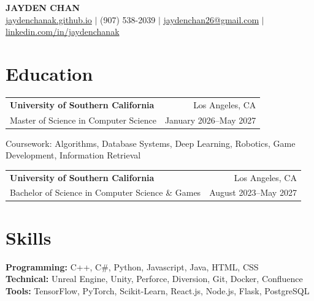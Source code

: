 \documentclass[letterpaper,10pt]{article}
\makeatletter
\newcommand{\entry}[4]{%
  \noindent\begin{tabularx}{\textwidth}{@{}X r@{}}
    \textbf{#1} & #2 \\
    #3 & #4 \\
  \end{tabularx}%
  \vspace{-2pt}
}
\makeatother
\begin{document}
\begin{center}
  {\LARGE\bfseries JAYDEN CHAN}\\[4pt]
  \href{https://jaydenchanak.github.io}{jaydenchanak.github.io} $|$
  (907) 538-2039 $|$
  \href{mailto:jaydenchan26@gmail.com}{jaydenchan26@gmail.com} $|$
  \href{https://www.linkedin.com/in/jaydenchanak}{linkedin.com/in/jaydenchanak}
\end{center}

\section{Education}
\entry{University of Southern California}{Los Angeles, CA}
      {Master of Science in Computer Science}{January 2026--May 2027}
\begin{tight}
  \item Coursework: Algorithms, Database Systems, Deep Learning, Robotics, Game Development, Information Retrieval
\end{tight}
\vspace{2pt}
\entry{University of Southern California}{Los Angeles, CA}
      {Bachelor of Science in Computer Science \& Games}{August 2023--May 2027}

\section{Skills}
\textbf{Programming:} C++, C\#, Python, Javascript, Java, HTML, CSS\\
\textbf{Technical:} Unreal Engine, Unity, Perforce, Diversion, Git, Docker, Confluence\\
\textbf{Tools:} TensorFlow, PyTorch, Scikit-Learn, React.js, Node.js, Flask, PostgreSQL

\end{document}
